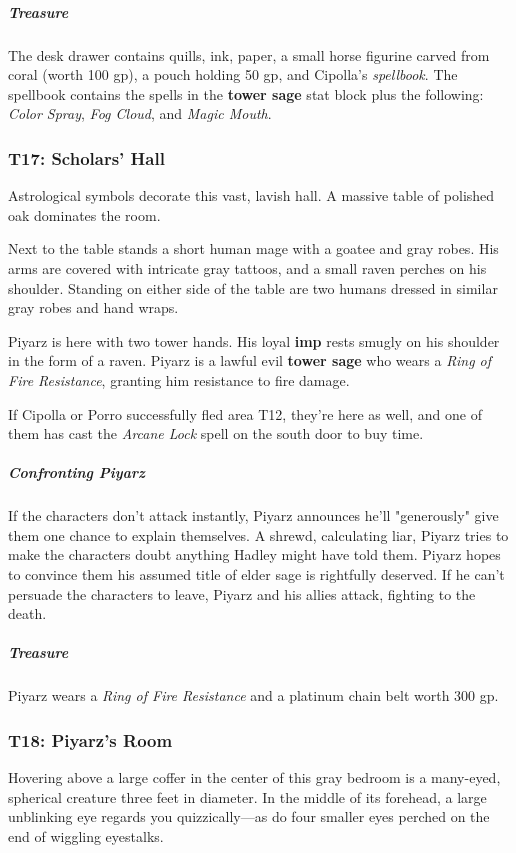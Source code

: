 \documentclass[10pt,a4paper,twoside,bg=print,twocolumn,openany,nodeprecatedcode]{dndbook}
\begin{document}
\subparagraph{Treasure}
The desk drawer contains quills, ink, paper, a small horse figurine carved from coral (worth 100 gp), a pouch holding 50 gp, and Cipolla's \textit{spellbook}. The spellbook contains the spells in the \textbf{tower sage} stat block plus the following: \textit{Color Spray}, \textit{Fog Cloud}, and \textit{Magic Mouth}.

\subsubsection{T17: Scholars' Hall}
\begin{DndReadAloud}{}
Astrological symbols decorate this vast, lavish hall. A massive table of polished oak dominates the room.

Next to the table stands a short human mage with a goatee and gray robes. His arms are covered with intricate gray tattoos, and a small raven perches on his shoulder. Standing on either side of the table are two humans dressed in similar gray robes and hand wraps.

\end{DndReadAloud}

Piyarz is here with two tower hands. His loyal \textbf{imp} rests smugly on his shoulder in the form of a raven. Piyarz is a lawful evil \textbf{tower sage} who wears a \textit{Ring of Fire Resistance}, granting him resistance to fire damage.

If Cipolla or Porro successfully fled area T12, they're here as well, and one of them has cast the \textit{Arcane Lock} spell on the south door to buy time.

\subparagraph{Confronting Piyarz}
If the characters don't attack instantly, Piyarz announces he'll "generously" give them one chance to explain themselves. A shrewd, calculating liar, Piyarz tries to make the characters doubt anything Hadley might have told them. Piyarz hopes to convince them his assumed title of elder sage is rightfully deserved. If he can't persuade the characters to leave, Piyarz and his allies attack, fighting to the death.

\subparagraph{Treasure}
Piyarz wears a \textit{Ring of Fire Resistance} and a platinum chain belt worth 300 gp.

\subsubsection{T18: Piyarz's Room}
\begin{DndReadAloud}{}
Hovering above a large coffer in the center of this gray bedroom is a many-eyed, spherical creature three feet in diameter. In the middle of its forehead, a large unblinking eye regards you quizzically—as do four smaller eyes perched on the end of wiggling eyestalks.

\end{DndReadAloud}
\end{document}
